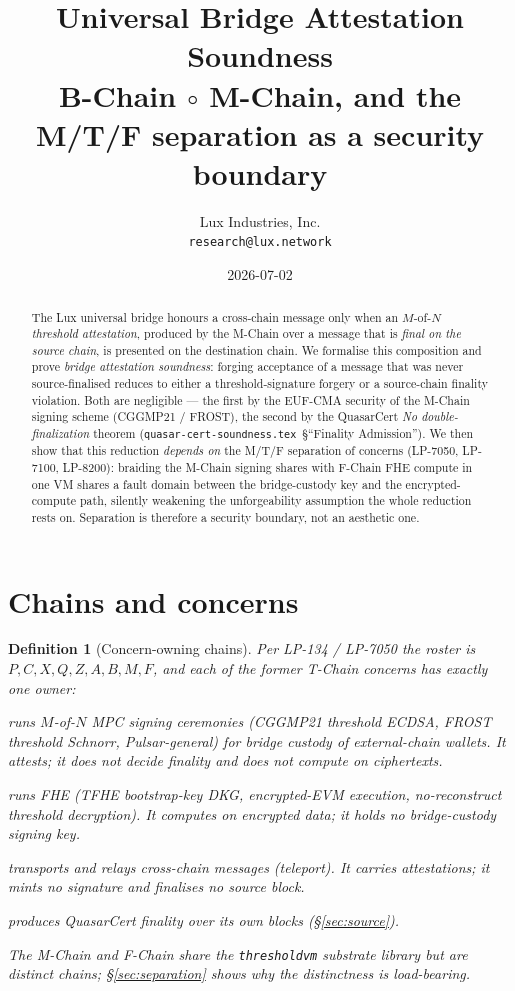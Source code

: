\documentclass[11pt]{article}
\title{Universal Bridge Attestation Soundness\\
{\large B-Chain $\circ$ M-Chain, and the M/T/F separation as a
security boundary}}
\author{Lux Industries, Inc.\\ \texttt{research@lux.network}}
\date{2026-07-02}
\newtheorem{definition}[theorem]{Definition}
\begin{document}
\maketitle

\begin{abstract}
The Lux universal bridge honours a cross-chain message only when an
$M$-of-$N$ \emph{threshold attestation}, produced by the M-Chain over a
message that is \emph{final on the source chain}, is presented on the
destination chain. We formalise this composition and prove
\emph{bridge attestation soundness}: forging acceptance of a message
that was never source-finalised reduces to either a threshold-signature
forgery or a source-chain finality violation. Both are negligible ---
the first by the EUF-CMA security of the M-Chain signing scheme
(CGGMP21 / FROST), the second by the QuasarCert
\emph{No double-finalization} theorem
(\texttt{quasar-cert-soundness.tex}~\S``Finality Admission''). We then
show that this reduction \emph{depends on} the M/T/F separation of
concerns (LP-7050, LP-7100, LP-8200): braiding the M-Chain signing
shares with F-Chain FHE compute in one VM shares a fault domain between
the bridge-custody key and the encrypted-compute path, silently
weakening the unforgeability assumption the whole reduction rests on.
Separation is therefore a security boundary, not an aesthetic one.
\end{abstract}

\section{Chains and concerns}
\label{sec:chains}

\begin{definition}[Concern-owning chains]
\label{def:mtf}
Per LP-134 / LP-7050 the roster is $P,C,X,Q,Z,A,B,M,F$, and each of the
former T-Chain concerns has exactly one owner:
\begin{description}[nosep,leftmargin=2em]
  \item[M-Chain (MVM, LP-7100):] runs $M$-of-$N$ MPC signing ceremonies
        (CGGMP21 threshold ECDSA, FROST threshold Schnorr, Pulsar-general)
        for bridge custody of external-chain wallets. It \emph{attests};
        it does not decide finality and does not compute on ciphertexts.
  \item[F-Chain (FVM, LP-8200):] runs FHE (TFHE bootstrap-key DKG,
        encrypted-EVM execution, no-reconstruct threshold decryption). It
        \emph{computes on encrypted data}; it holds no bridge-custody
        signing key.
  \item[B-Chain (\texttt{bridgevm}, LP-6000):] transports and relays
        cross-chain messages (teleport). It \emph{carries} attestations;
        it mints no signature and finalises no source block.
  \item[Source chain $S$ (any Lux L1/L2):] produces QuasarCert finality
        over its own blocks (\S\ref{sec:source}).
\end{description}
The M-Chain and F-Chain \emph{share} the \texttt{thresholdvm} substrate
library but are distinct chains; \S\ref{sec:separation} shows why the
distinctness is load-bearing.
\end{definition}
\end{document}
